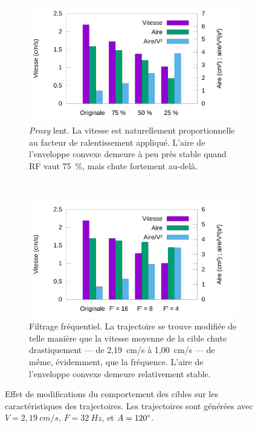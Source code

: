	\begin{figure}[!htb]
		\begin{subfigure}[t]{0.49\textwidth}
			\centering
			\includegraphics[width=\textwidth]{figures/ch5/filteringBySpeedRedHistograms}
			\caption{\emph{Proxy} lent. La vitesse est naturellement proportionnelle au facteur de ralentissement appliqué. L'aire de l'enveloppe convexe demeure à peu près stable quand RF vaut 75~\%{}, mais chute fortement au-delà.}
			\label{fig:filteringBySpeedRed}
		\end{subfigure}
		~
		\begin{subfigure}[t]{0.49\textwidth}
			\centering
			\includegraphics[width=\textwidth]{figures/ch5/filteringByFHistograms}
			\caption{Filtrage fréquentiel. La trajectoire se trouve modifiée de telle manière que la vitesse moyenne de la cible chute drastiquement --- de 2,19~cm/s à 1,00~cm/s --- de même, évidemment, que la fréquence. L'aire de l'enveloppe convexe demeure relativement stable.}
			\label{fig:filteringByFHistograms}
		\end{subfigure}
		\caption[Effet de modifications du comportement des cibles]{Effet de modifications du comportement des cibles sur les caractéristiques des trajectoires. Les trajectoires sont générées avec $V=2,19~cm/s$, $F=32~Hz$, et $A=120\degree{}$.}
		\label{fig:speedRedAndFilteringbyFhistograms}
	\end{figure}
	
